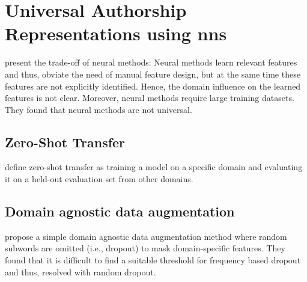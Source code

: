 \section{Universal Authorship Representations using \acp{nn}}
\label{sec:universal_authorship_representations}

\citet{rivera_soto_learning_2021} present the trade-off of neural methods:
Neural methods learn relevant features and thus, obviate the need of manual feature design, but 
at the same time these features are not explicitly identified.
Hence, the domain influence on the learned features is not clear.
Moreover, neural methods require large training datasets.
They found that neural methods are not universal.

\subsection{Zero-Shot Transfer}
\citet{rivera_soto_learning_2021} define zero-shot transfer as training a model on a specific domain and 
evaluating it on a held-out evaluation set from other domains. %

\subsection{Domain agnostic data augmentation}
\citet{rivera_soto_learning_2021} propose a simple domain agnostic data augmentation method where 
random subwords are omitted (i.e., dropout) to mask domain-specific features.
They found that it is difficult to find a suitable threshold for frequency based dropout and thus, 
resolved with random dropout.